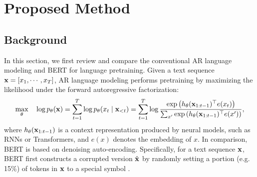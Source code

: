 \section{Proposed Method}


\subsection{Background}
\label{sec:background}
In this section, we first review and compare the conventional AR language modeling and BERT for language pretraining.
Given a text sequence ${\mathbf{x}} = \left[ {x_1, \cdots, x_T} \right]$, AR language modeling performs pretraining by maximizing the likelihood under the forward autoregressive factorization:
\begin{equation}
\label{eqn:ar}
\max_{\theta}\quad \log p_\theta({\mathbf{x}}) 
	= \sum_{t=1}^{T} \log p_\theta(x_t \mid {\mathbf{x}}_{<t}) 
	= \sum_{t=1}^{T} \log \frac{ \exp \left( { h_\theta({\mathbf{x}}_{1:t-1})^\top e(x_t) } \right) }{\sum_{x'} \exp \left( { h_\theta({\mathbf{x}}_{1:t-1})^\top e(x') } \right) },
\end{equation}
where $h_\theta({\mathbf{x}}_{1:t-1})$ is a context representation produced by neural models, such as RNNs or Transformers, and $e(x)$ denotes the embedding of $x$.
In comparison, BERT is based on denoising auto-encoding.
Specifically, for a text sequence ${\mathbf{x}}$, BERT first constructs a corrupted version $\hat{{\mathbf{x}}}$ by randomly setting a portion (e.g. 15\%) of tokens in ${\mathbf{x}}$ to a special symbol \mask.
